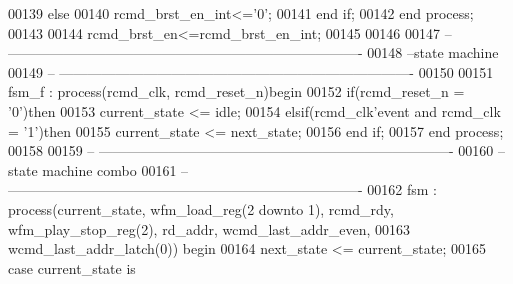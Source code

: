 \begin{DoxyCode}
00139     \textcolor{keywordflow}{else} 
00140         \textcolor{vhdlchar}{rcmd_brst_en_int}\textcolor{vhdlchar}{<=}\textcolor{vhdlchar}{'}\textcolor{vhdllogic}{}\textcolor{vhdllogic}{0}\textcolor{vhdlchar}{'};
00141     \textcolor{keywordflow}{end} \textcolor{keywordflow}{if};
00142 \textcolor{keywordflow}{end} \textcolor{keywordflow}{process};
00143 
00144 \textcolor{vhdlchar}{rcmd_brst_en}\textcolor{vhdlchar}{<=}\textcolor{vhdlchar}{rcmd_brst_en_int};
00145 
00146 
00147 \textcolor{keyword}{-- ----------------------------------------------------------------------------}
00148 \textcolor{keyword}{--state machine}
00149 \textcolor{keyword}{-- ----------------------------------------------------------------------------}
00150 
00151 fsm\_f : \textcolor{keywordflow}{process}(rcmd_clk, rcmd_reset_n)\textcolor{keywordflow}{begin}
00152     \textcolor{keywordflow}{if}\textcolor{vhdlchar}{(}\textcolor{vhdlchar}{rcmd_reset_n} \textcolor{vhdlchar}{=} \textcolor{vhdlchar}{'}\textcolor{vhdllogic}{}\textcolor{vhdllogic}{0}\textcolor{vhdlchar}{'}\textcolor{vhdlchar}{)}\textcolor{keywordflow}{then}
00153         \textcolor{vhdlchar}{current_state} \textcolor{vhdlchar}{<=} \textcolor{vhdlchar}{idle};
00154     \textcolor{keywordflow}{elsif}\textcolor{vhdlchar}{(}\textcolor{vhdlchar}{rcmd_clk}\textcolor{vhdlchar}{'}\textcolor{vhdlkeyword}{event} \textcolor{keywordflow}{and} \textcolor{vhdlchar}{rcmd_clk} \textcolor{vhdlchar}{=} \textcolor{vhdlchar}{'}\textcolor{vhdllogic}{}\textcolor{vhdllogic}{1}\textcolor{vhdlchar}{'}\textcolor{vhdlchar}{)}\textcolor{keywordflow}{then} 
00155         \textcolor{vhdlchar}{current_state} \textcolor{vhdlchar}{<=} \textcolor{vhdlchar}{next_state};
00156     \textcolor{keywordflow}{end} \textcolor{keywordflow}{if}; 
00157 \textcolor{keywordflow}{end} \textcolor{keywordflow}{process};
00158 
00159 \textcolor{keyword}{-- ----------------------------------------------------------------------------}
00160 \textcolor{keyword}{--state machine combo}
00161 \textcolor{keyword}{-- ----------------------------------------------------------------------------}
00162 fsm : \textcolor{keywordflow}{process}(current_state, wfm_load_reg(\textcolor{vhdllogic}{2} \textcolor{keywordflow}{downto} \textcolor{vhdllogic}{1}), rcmd_rdy, 
      wfm_play_stop_reg(\textcolor{vhdllogic}{2}), rd_addr, wcmd_last_addr_even,
00163                 wcmd_last_addr_latch(\textcolor{vhdllogic}{0})) \textcolor{keywordflow}{begin}
00164     \textcolor{vhdlchar}{next_state} \textcolor{vhdlchar}{<=} \textcolor{vhdlchar}{current_state};
00165     \textcolor{keywordflow}{case} \textcolor{vhdlchar}{current_state} \textcolor{keywordflow}{is}

\end{DoxyCode}

